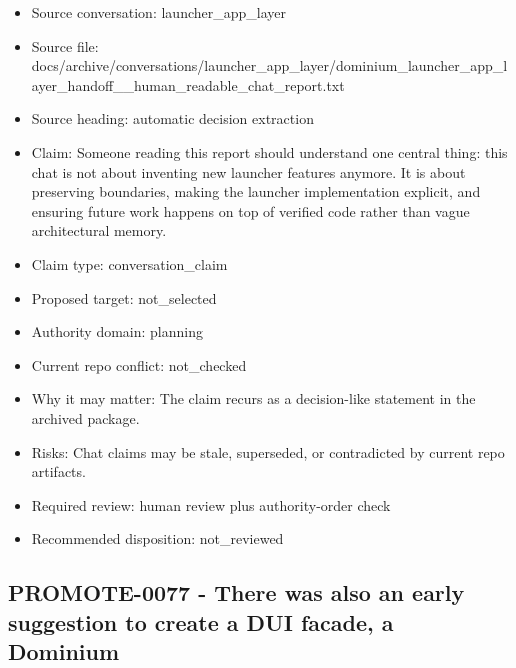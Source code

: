 \documentclass[11pt,a4paper]{report}
\begin{document}
\begin{itemize}
\item Source conversation: launcher\_app\_layer
\item Source file: docs/archive/conversations/launcher\_app\_layer/dominium\_launcher\_app\_layer\_handoff\_\_human\_readable\_chat\_report.txt
\item Source heading: automatic decision extraction
\item Claim: Someone reading this report should understand one central thing: this chat is not about inventing new launcher features anymore. It is about preserving boundaries, making the launcher implementation explicit, and ensuring future work happens on top of verified code rather than vague architectural memory.
\item Claim type: conversation\_claim
\item Proposed target: not\_selected
\item Authority domain: planning
\item Current repo conflict: not\_checked
\item Why it may matter: The claim recurs as a decision-like statement in the archived package.
\item Risks: Chat claims may be stale, superseded, or contradicted by current repo artifacts.
\item Required review: human review plus authority-order check
\item Recommended disposition: not\_reviewed
\end{itemize}

\subsection{PROMOTE-0077 - There was also an early suggestion to create a DUI facade, a Dominium}
\end{document}
